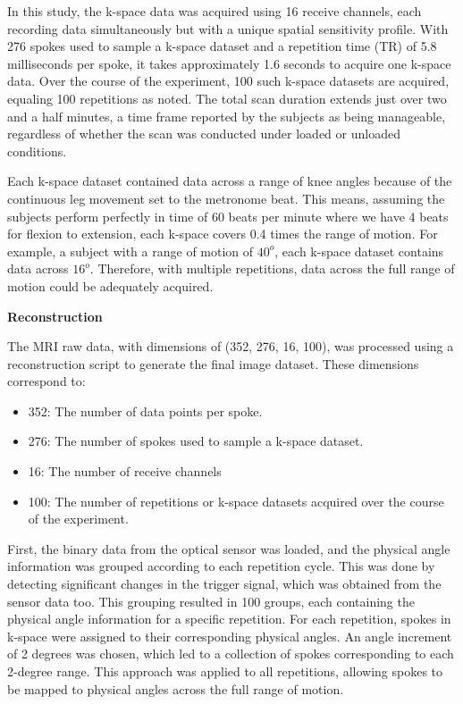 \documentclass{micro-econ-thesis}
\begin{document}
In this study, the k-space data was acquired using 16 receive channels, each recording data simultaneously but with a unique spatial sensitivity profile. With 276 spokes used to sample a k-space dataset and a repetition time (TR) of 5.8 milliseconds per spoke, it takes approximately 1.6 seconds to acquire one k-space data. Over the course of the experiment, 100 such k-space datasets are acquired, equaling 100 repetitions as noted. The total scan duration extends just over two and a half minutes, a time frame reported by the subjects as being manageable, regardless of whether the scan was conducted under loaded or unloaded conditions.

Each k-space dataset contained data across a range of knee angles because of the continuous leg movement set to the metronome beat. This means, assuming the subjects perform perfectly in time of 60 beats per minute where we have 4 beats for flexion to extension, each k-space covers 0.4 times the range of motion. For example, a subject with a range of motion of $40^o$, each k-space dataset contains data across $16^o$. Therefore, with multiple repetitions, data across the full range of motion could be adequately acquired.      

\textbf{Reconstruction}


The MRI raw data, with dimensions of (352, 276, 16, 100), was processed using a reconstruction script to generate the final image dataset. These dimensions correspond to: 
\begin{itemize}
	\item 352: The number of data points per spoke.
	\item 276: The number of spokes used to sample a k-space dataset.
	\item 16: The number of receive channels
	\item 100: The number of repetitions or k-space datasets acquired over the course of the experiment.
\end{itemize}


First, the binary data from the optical sensor was loaded, and the physical angle information was grouped according to each repetition cycle. This was done by detecting significant changes in the trigger signal, which was obtained from the sensor data too. This grouping resulted in 100 groups, each containing the physical angle information for a specific repetition. For each repetition, spokes in k-space were assigned to their corresponding physical angles. An angle increment of 2 degrees was chosen, which led to a collection of spokes corresponding to each 2-degree range. This approach was applied to all repetitions, allowing spokes to be mapped to physical angles across the full range of motion.
\end{document}

